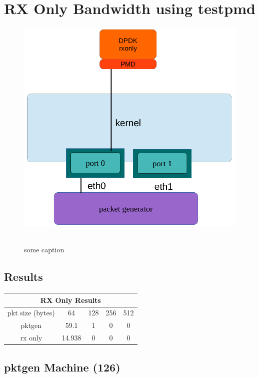 \documentclass[letter]{article}
\begin{document}
\section{RX Only Bandwidth using testpmd}
{\setlength{\parindent}{0cm}

\begin{figure}[H]
\caption{some caption}
\hbox{\includegraphics[scale=0.6]{rx-only} }
\end{figure}

\subsection{Results}
\begin{center}
\begin{tabular}{ |c|c|c|c|c| }
\hline
\multicolumn{5}{|c|}{RX Only Results} \\
 \hline
 pkt size (bytes) & 64 & 128 & 256 & 512 \\ 
 pktgen & 59.1 & 1 & 0 & 0  \\ 
 rx only & 14.938 & 0 & 0 & 0 \\ 
 \hline
\end{tabular}
\end{center}

\subsection{pktgen Machine (126)}

}
\end{document}
